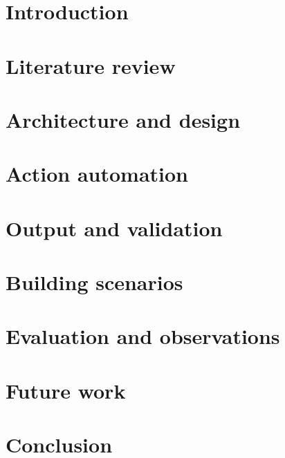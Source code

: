 \chapter{Introduction}\label{chapter-one}

\chapter{Literature review}\label{chapter-two}

\chapter{Architecture and design}\label{chapter-three}

\chapter{Action automation}\label{chapter-four}

\chapter{Output and validation}\label{chapter-five}

\chapter{Building scenarios}\label{chapter-six}

\chapter{Evaluation and observations}\label{chapter-seven}

\chapter{Future work}\label{chapter-eight}

\chapter{Conclusion}\label{chapter-nine}
